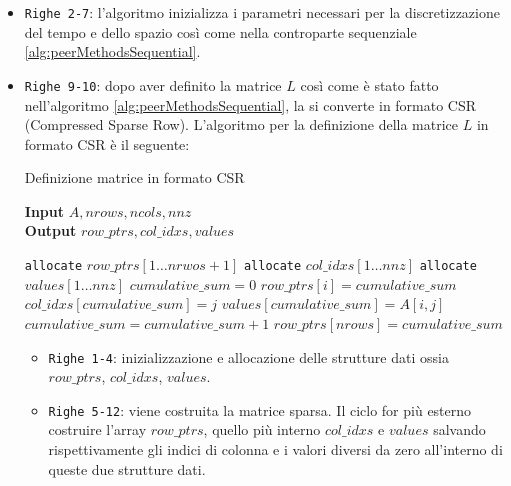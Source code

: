 \vspace{0.2cm}
\begin{itemize}
    \item \texttt{Righe 2-7}: l'algoritmo inizializza i parametri necessari per la discretizzazione del tempo e dello spazio così come nella controparte sequenziale \ref{alg:peerMethodsSequential}.
    
    \item \texttt{Righe 9-10}: dopo aver definito la matrice $L$ così come è stato fatto nell'algoritmo \ref{alg:peerMethodsSequential}, la si converte in formato CSR (Compressed Sparse Row). L'algoritmo per la definizione della matrice $L$ in formato CSR è il seguente:
    \begin{breakablealgorithm}
        \caption{Definizione matrice in formato CSR}\label{alg:CSRAlg}
        \vspace{0.5cm}
        \textbf{Input} $A, nrows, ncols, nnz$ \\
        \textbf{Output} $row\_ptrs, col\_idxs, values$
        \vspace{0.5cm}
        \begin{algorithmic}[1]
            \State \texttt{allocate} $row\_ptrs[1\ldots nrwos + 1]$
            \State \texttt{allocate} $col\_idxs[1 \ldots nnz]$
            \State \texttt{allocate} $values[1 \ldots nnz]$
            \State $cumulative\_sum = 0$
                \State $row\_ptrs[i] = cumulative\_sum$
                    \State $col\_idxs[cumulative\_sum] = j$
                    \State $values[cumulative\_sum] = A[i, j]$
                    \State $cumulative\_sum = cumulative\_sum + 1$
                \EndFor
            \EndFor
            \State $row\_ptrs[nrows] = cumulative\_sum$
        \end{algorithmic}
    \end{breakablealgorithm}

    \begin{itemize}
        \item \texttt{Righe 1-4}: inizializzazione e allocazione delle strutture dati ossia $row\_ptrs$, $col\_idxs$, $values$.
        \item \texttt{Righe 5-12}: viene costruita la matrice sparsa. Il ciclo for più esterno costruire l'array $row\_ptrs$, quello più interno $col\_idxs$ e $values$ salvando rispettivamente gli indici di colonna e i valori diversi da zero all'interno di queste due strutture dati.
    \end{itemize}
    

\end{itemize}
